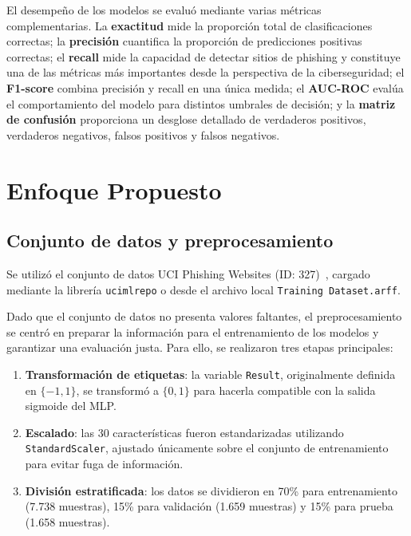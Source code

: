 \documentclass[conference]{IEEEtran}
\begin{document}
El desempeño de los modelos se evaluó mediante varias métricas complementarias. La \textbf{exactitud} mide la proporción total de clasificaciones correctas; la \textbf{precisión} cuantifica la proporción de predicciones positivas correctas; el \textbf{recall} mide la capacidad de detectar sitios de phishing y constituye una de las métricas más importantes desde la perspectiva de la ciberseguridad; el \textbf{F1-score} combina precisión y recall en una única medida; el \textbf{AUC-ROC} evalúa el comportamiento del modelo para distintos umbrales de decisión; y la \textbf{matriz de confusión} proporciona un desglose detallado de verdaderos positivos, verdaderos negativos, falsos positivos y falsos negativos.

\section{Enfoque Propuesto}

\subsection{Conjunto de datos y preprocesamiento}

Se utilizó el conjunto de datos UCI Phishing Websites (ID: 327)~\cite{uci327}, cargado mediante la librería \texttt{ucimlrepo} o desde el archivo local \texttt{Training Dataset.arff}.

Dado que el conjunto de datos no presenta valores faltantes, el preprocesamiento se centró en preparar la información para el entrenamiento de los modelos y garantizar una evaluación justa. Para ello, se realizaron tres etapas principales:

\begin{enumerate}

\item \textbf{Transformación de etiquetas}: la variable \texttt{Result}, originalmente definida en $\{-1,1\}$, se transformó a $\{0,1\}$ para hacerla compatible con la salida sigmoide del MLP.

\item \textbf{Escalado}: las 30 características fueron estandarizadas utilizando \texttt{StandardScaler}, ajustado únicamente sobre el conjunto de entrenamiento para evitar fuga de información.

\item \textbf{División estratificada}: los datos se dividieron en 70\% para entrenamiento (7.738 muestras), 15\% para validación (1.659 muestras) y 15\% para prueba (1.658 muestras).
\end{enumerate}
\end{document}

